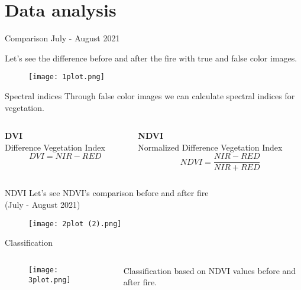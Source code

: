 \documentclass{beamer} %
\begin{document}
\section{Data analysis} %

\begin{frame}{Comparison July - August 2021}

\centering
Let's see the difference before and after the fire with true and false color images. 
\begin{figure}
    \centering
    \texttt{[image: 1plot.png]}
\end{figure}
\end{frame}

\begin{frame}{Spectral indices}
\centering %
Through false color images we can calculate spectral indices for vegetation.
\bigskip %
\bigskip
\begin{columns}
    \begin{column}[t]{0.55\textwidth}
    \centering
    \textbf{DVI}\\ \small Difference Vegetation Index
    \begin{equation*}
        DVI = NIR - RED
    \end{equation*}
    \end{column}

    \begin{column}[t]{0.6\textwidth}
    \centering
    \textbf{NDVI}\\ \small Normalized Difference Vegetation Index
    \begin{equation*}
        NDVI = \frac{NIR - RED}{NIR + RED}
    \end{equation*}
    \end{column}   
\end{columns}    
\end{frame}

\begin{frame}{NDVI}
\centering
Let's see NDVI's comparison before and after fire\\
(July - August 2021)
\begin{figure}
    \centering
    \texttt{[image: 2plot (2).png]}
\end{figure}   
\end{frame}

\begin{frame}{Classification}
\begin{columns}
    \begin{column}{0.65\textwidth}
    \begin{figure}
           \centering
           \texttt{[image: 3plot.png]}
       \end{figure}   
    \end{column}

    \begin{column}{0.5\textwidth}
       Classification based on NDVI values before and after fire. 
    \end{column}
\end{columns}    
\end{frame}
\end{document}
